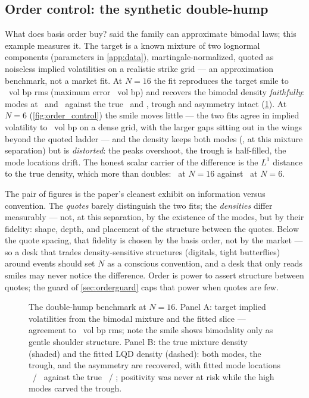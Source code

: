 \subsection{Order control: the synthetic double-hump}

What does basis order buy?   said the family can
approximate bimodal laws; this example measures it.  The target is a
known mixture of two lognormal components (parameters in
\cref{app:data}), martingale-normalized, quoted as noiseless implied
volatilities on a realistic strike grid --- an approximation benchmark,
not a market fit.  At $N=16$ the fit reproduces the target smile to
\MacHumpFitRmsBp\ vol bp rms (maximum error \MacDhMaxErrBpHigh\ vol bp)
and recovers the bimodal density \emph{faithfully}: modes at
\MacDhModeLeft\ and \MacDhModeRight\ against the true
\MacDhTrueModeLeft\ and \MacDhTrueModeRight, trough and asymmetry
intact (\cref{fig:doublehump}).  At $N=6$ (\cref{fig:order_control})
the smile moves little --- the two fits agree in implied volatility to
\MacHumpIvAgreeBp\ vol bp on a dense grid, with the larger gaps sitting
out in the wings beyond the quoted ladder --- and the density keeps
both modes (\MacDhModeCountLow, at this mixture separation) but is
\emph{distorted}: the peaks overshoot, the trough is half-filled, the
mode locations drift.  The honest scalar carrier of the difference is
the $L^1$ distance to the true density, which more than doubles:
\MacHumpLOneNSixteen\ at $N=16$ against \MacHumpLOneNSix\ at $N=6$.

The pair of figures is the paper's cleanest exhibit on information
versus convention.  The \emph{quotes} barely distinguish the two fits;
the \emph{densities} differ measurably --- not, at this separation, by
the existence of the modes, but by their fidelity: shape, depth, and
placement of the structure between the quotes.  Below the quote
spacing, that fidelity is chosen by the basis order, not by the market
--- so a desk that trades density-sensitive structures (digitals,
tight butterflies) around events should set $N$ as a conscious
convention, and a desk that only reads smiles may never notice the
difference.  Order is power to assert structure between quotes; the
guard of \cref{sec:orderguard} caps that power when quotes are few.

\begin{figure}[htbp]
\centering
{}
\caption{The double-hump benchmark at $N=16$.  Panel A: target implied
volatilities from the bimodal mixture and the fitted slice ---
agreement to \MacHumpFitRmsBp\ vol bp rms; note the smile shows
bimodality only as gentle shoulder structure.  Panel B: the true
mixture density (shaded) and the fitted LQD density (dashed): both
modes, the trough, and the asymmetry are recovered, with fitted mode
locations \MacDhModeLeft\ / \MacDhModeRight\ against the true
\MacDhTrueModeLeft\ / \MacDhTrueModeRight; positivity was never at risk
while the high modes carved the trough.}
\label{fig:doublehump}
\end{figure}

